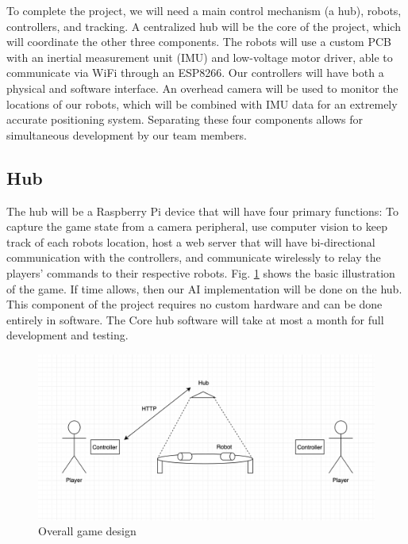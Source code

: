 \documentclass[11pt]{ieeeconf}
\begin{document}
To complete the project, we will need a main control mechanism (a hub), robots, controllers, and tracking. A centralized hub will be the core of the project, which will coordinate the other three components. The robots will use a custom PCB with an inertial measurement unit (IMU) and low-voltage motor driver, able to communicate via WiFi through an ESP8266. Our controllers will have both a physical and software interface. An overhead camera will be used to monitor the locations of our robots, which will be combined with IMU data for an extremely accurate positioning system. Separating these four components allows for simultaneous development by our team members.

\subsection{Hub}

The hub will be a Raspberry Pi device that will have four primary functions: To capture the game state from a camera peripheral, use computer vision to keep track of each robots location, host a web server that will have bi-directional communication with the controllers, and communicate wirelessly to relay the players' commands to their respective robots. Fig. \ref{Illustration} shows the basic illustration of the game. If time allows, then our AI implementation will be done on the hub. This component of the project requires no custom hardware and can be done entirely in software. The Core hub software will take at most a month for full development and testing. 

 \begin{figure}[!t]
  \centering
  \captionsetup{justification=centering}
      \includegraphics[width=14cm]{images/Overall.png}
        \caption{Overall game design}
        \label{Illustration}
\end{figure}
\end{document}
